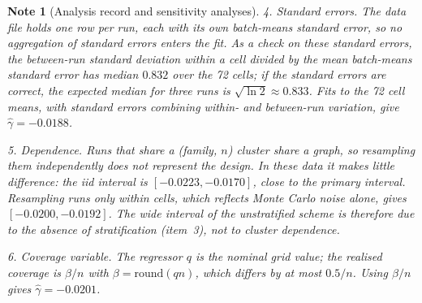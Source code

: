 \documentclass[pdflatex,sn-mathphys-num]{sn-jnl}
\newcommand{\IidLo}{-0.0223}
\newcommand{\IidHi}{-0.0170}
\newcommand{\McLo}{-0.0200}
\newcommand{\McHi}{-0.0192}
\newcommand{\CellMeansPt}{-0.0188}
\newcommand{\QePt}{-0.0201}
\newcommand{\SeRatioMed}{0.832}
\theoremstyle{thmstyleone}%
\theoremstyle{thmstylethree}%
\newtheorem{note}[theorem]{Note}
\theoremstyle{thmstyletwo}%
\begin{document}
\begin{note}[Analysis record and sensitivity analyses]
\emph{4. Standard errors.} The data file holds one row per run, each with
its own batch-means standard error, so no aggregation of standard errors
enters the fit. As a check on these standard errors, the between-run
standard deviation within a cell divided by the mean batch-means standard
error has median $\SeRatioMed$ over the 72 cells; if the standard errors
are correct, the expected median for three runs is
$\sqrt{\ln2}\approx0.833$. Fits to the 72 cell means, with standard
errors combining within- and between-run variation, give
$\hat\gamma=\CellMeansPt$.

\emph{5. Dependence.} Runs that share a (family, $n$) cluster share a
graph, so resampling them independently does not represent the design.
In these data it makes little difference: the iid interval is
$[\IidLo,\IidHi]$, close to the primary interval. Resampling runs only
within cells, which reflects Monte Carlo noise alone, gives
$[\McLo,\McHi]$. The wide interval of the unstratified scheme is
therefore due to the absence of stratification (item~3), not to cluster
dependence.

\emph{6. Coverage variable.} The regressor $q$ is the nominal grid value;
the realised coverage is $\beta/n$ with $\beta=\mathrm{round}(qn)$, which
differs by at most $0.5/n$. Using $\beta/n$ gives $\hat\gamma=\QePt$.
\end{note}
\end{document}

